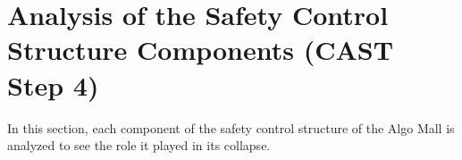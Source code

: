 \documentclass[12pt]{article}
\begin{document}













\section{Analysis of the Safety Control Structure Components (CAST Step 4)}

In this section, each component of the safety control structure of the Algo Mall is analyzed to see the role it played in its collapse.
\end{document}
